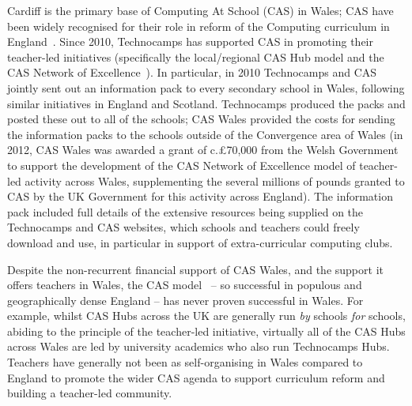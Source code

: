 \documentclass{llncs}
\begin{document}
Cardiff is the primary base of Computing At School (CAS) in Wales; CAS
have been widely recognised for their role in reform of the Computing
curriculum in England~\cite{brown-et-al-toce2014}. Since 2010,
Technocamps has supported CAS in promoting their teacher-led
initiatives (specifically the local/regional CAS Hub model and the CAS
Network of
Excellence~\cite{brown-et-al-toce2014,sentance-et-al-wipsce2012,sentance-et-al:wipsce2014}).
In particular, in 2010 Technocamps and CAS jointly sent out an
information pack to every secondary school in Wales, following similar
initiatives in England and Scotland. Technocamps produced the packs
and posted these out to all of the schools; CAS Wales provided the
costs for sending the information packs to the schools outside of the
Convergence area of Wales (in 2012, CAS Wales was awarded a grant of
c.\pounds70,000 from the Welsh Government to support the development
of the CAS Network of Excellence model of teacher-led activity across
Wales, supplementing the several millions of pounds granted to CAS by
the UK Government for this activity across England).  The information
pack included full details of the extensive resources being supplied
on the Technocamps and CAS websites, which schools and teachers could
freely download and use, in particular in support of extra-curricular
computing clubs.

 

Despite the non-recurrent financial support of CAS Wales, and the
support it offers teachers in Wales, the CAS
model~\cite{sentance-et-al:wipsce2014} -- so successful in populous and
geographically dense England -- has never proven successful in Wales.
For example, whilst CAS Hubs across the UK are generally run \emph{by}
schools \emph{for} schools, abiding to the principle of the
teacher-led initiative, virtually all of the CAS Hubs across Wales are
led by university academics who also run Technocamps Hubs.
Teachers have generally not been as self-organising in Wales compared
to England to promote the wider CAS agenda to support
curriculum reform and building a teacher-led community.
\end{document}
